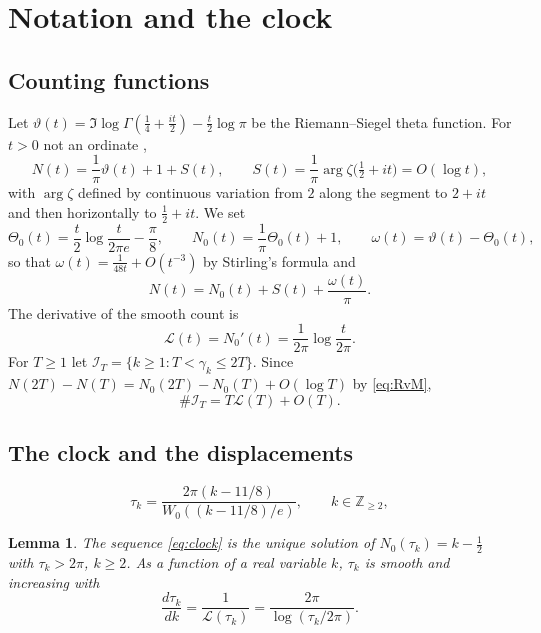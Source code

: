 \documentclass[11pt,reqno]{amsart}
\theoremstyle{plain}\newtheorem{theorem}{Theorem}[section]\newtheorem{proposition}[theorem]{Proposition}\newtheorem{lemma}[theorem]{Lemma}\newtheorem{corollary}[theorem]{Corollary}
\theoremstyle{definition}\newtheorem{hypothesis}[theorem]{Hypothesis}\newtheorem{definition}[theorem]{Definition}
\theoremstyle{remark}\newtheorem{remark}[theorem]{Remark}\newtheorem{experiment}[theorem]{Experiment}\newtheorem{question}[theorem]{Question}\newtheorem{heuristic}[theorem]{Heuristic}\newtheorem{conjecture}[theorem]{Conjecture}
\newcommand{\NO}{N_0}\newcommand{\lL}{\mathcal L}\newcommand{\IT}{\mathcal I_T}\newcommand{\R}{\mathbb R}\newcommand{\N}{\mathbb N}\newcommand{\eps}{\varepsilon}\newcommand{\sgn}{\operatorname{sgn}}
\begin{document}
\section{Notation and the clock}
\label{sec:notation}

\subsection{Counting functions}
\label{subsec:counting}
Let $\vartheta(t)=\Im\log\Gamma(\frac14+\frac{it}2)-\frac t2\log\pi$ be the Riemann--Siegel theta function. For $t>0$ not an ordinate \cite[Thms.~9.3--9.4]{Titchmarsh1986},
\begin{equation}
N(t)=\frac1\pi\vartheta(t)+1+S(t),\qquad S(t)=\frac1\pi\arg\zeta\bigl(\tfrac12+it\bigr)=O(\log t),
\label{eq:RvM}
\end{equation}
with $\arg\zeta$ defined by continuous variation from $2$ along the segment to $2+it$ and then horizontally to $\frac12+it$. We set
\begin{equation}
\Theta_0(t)=\frac t2\log\frac t{2\pi e}-\frac\pi8,\qquad \NO(t)=\frac1\pi\Theta_0(t)+1,\qquad \omega(t)=\vartheta(t)-\Theta_0(t),
\label{eq:N0_def}
\end{equation}
so that $\omega(t)=\frac1{48t}+O(t^{-3})$ by Stirling's formula and
\begin{equation}
N(t)=\NO(t)+S(t)+\frac{\omega(t)}\pi .
\label{eq:N_decomposition}
\end{equation}
The derivative of the smooth count is
\begin{equation}
\lL(t)=\NO'(t)=\frac1{2\pi}\log\frac t{2\pi}.
\label{eq:L_def}
\end{equation}
For $T\ge 1$ let $\IT=\{k\ge1:T<\gamma_k\le2T\}$. Since $N(2T)-N(T)=\NO(2T)-\NO(T)+O(\log T)$ by \eqref{eq:RvM},
\begin{equation}
\#\IT=T\lL(T)+O(T).
\label{eq:IT_size}
\end{equation}

\subsection{The clock and the displacements}
\label{subsec:clock}

\begin{equation}\label{eq:clock}
\tau_k=\frac{2\pi(k-11/8)}{W_0((k-11/8)/e)},\qquad k\in\mathbb Z_{\ge2},
\end{equation}
\begin{lemma}\label{lem:clock}
The sequence \eqref{eq:clock} is the unique solution of $\NO(\tau_k)=k-\frac12$ with $\tau_k>2\pi$, $k\ge2$. As a function of a real variable $k$, $\tau_k$ is smooth and increasing with
\begin{equation}
\frac{d\tau_k}{dk}=\frac1{\lL(\tau_k)}=\frac{2\pi}{\log(\tau_k/2\pi)}.
\label{eq:clock_derivative}
\end{equation}
\end{lemma}
\end{document}
